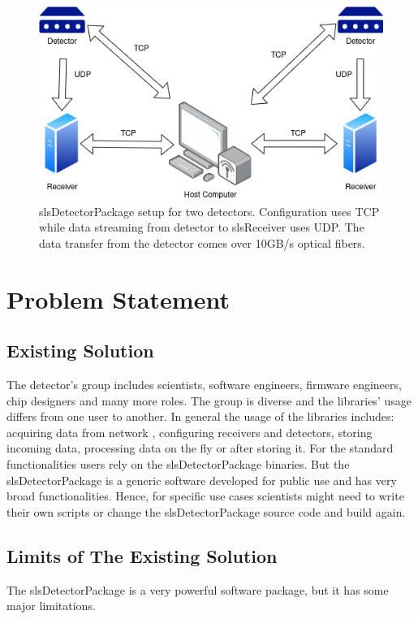 \begin{spacing}{1.2}
    \begin{figure}[h]
        \centering
        \includegraphics[scale=0.8]{Chapitre1/figures/slsreceiver.png}
        \caption{slsDetectorPackage setup for two detectors. Configuration uses TCP while
            data streaming from detector to slsReceiver uses UDP. The data transfer from the detector
            comes over 10GB/s optical fibers.}
        \label{fig:detector}
    \end{figure}

    \section{Problem Statement}
    \subsection{Existing Solution}
    The detector's group includes scientists, software engineers, firmware engineers, chip designers and many more roles.
    The group is diverse and the libraries' usage differs from one user to another. In general the usage of the libraries includes: acquiring data from network
    , configuring receivers and detectors, storing incoming data, processing data on the fly or after storing it.
    For the standard functionalities users rely on the slsDetectorPackage binaries. But the slsDetectorPackage is a generic software
    developed for public use and has very broad functionalities. Hence, for specific use cases scientists might need to write their own scripts
    or change the slsDetectorPackage source code and build again.
    \subsection{Limits of The Existing Solution}
    The slsDetectorPackage is a very powerful software package, but it has some major limitations.

\end{spacing}
